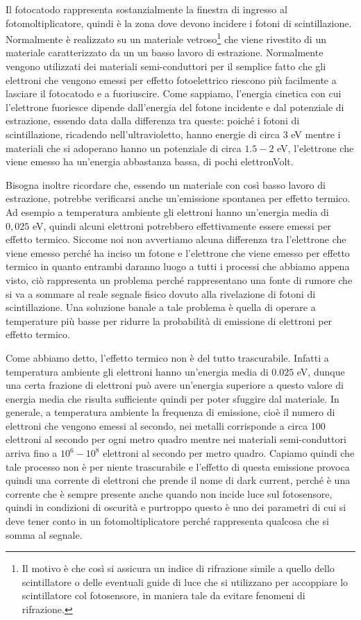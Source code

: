 Il fotocatodo rappresenta sostanzialmente la finestra di ingresso al fotomoltiplicatore, quindi è la zona dove devono incidere i fotoni di scintillazione. Normalmente è realizzato su un materiale vetroso\footnote{Il motivo è che così si assicura un indice di rifrazione simile a quello dello scintillatore o delle eventuali guide di luce che si utilizzano per accoppiare lo scintillatore col fotosensore, in maniera tale da evitare fenomeni di rifrazione.} che viene rivestito di un materiale caratterizzato da un un basso lavoro di estrazione. Normalmente vengono utilizzati dei materiali semi-conduttori per il semplice fatto che gli elettroni che vengono emessi per effetto fotoelettrico riescono più facilmente a lasciare il fotocatodo e a fuoriuscire. Come sappiamo, l'energia cinetica con cui l'elettrone fuoriesce dipende dall'energia del fotone incidente e dal potenziale di estrazione, essendo data dalla differenza tra queste: poiché i fotoni di scintillazione, ricadendo nell'ultravioletto, hanno energie di circa 3 eV mentre i materiali che si adoperano hanno un potenziale di circa $1.5-2$ eV, l'elettrone che viene emesso ha un'energia abbastanza bassa, di pochi elettronVolt.

Bisogna inoltre ricordare che, essendo un materiale con così basso lavoro di estrazione, potrebbe verificarsi anche un'emissione spontanea per effetto termico. Ad esempio a temperatura ambiente gli elettroni hanno un'energia media di $0,025$ eV, quindi alcuni elettroni potrebbero effettivamente essere emessi per effetto termico. Siccome noi non avvertiamo alcuna differenza tra l'elettrone che viene emesso perché ha inciso un fotone e l'elettrone che viene emesso per effetto termico in quanto entrambi daranno luogo a tutti i processi che abbiamo appena visto, ciò rappresenta un problema perché rappresentano una fonte di rumore che si va a sommare al reale segnale fisico dovuto alla rivelazione di fotoni di scintillazione. Una soluzione banale a tale problema è quella di operare a temperature più basse per ridurre la probabilità di emissione di elettroni per effetto termico.

Come abbiamo detto, l'effetto termico non è del tutto trascurabile. Infatti a temperatura ambiente gli elettroni hanno un'energia media di $0.025$ eV, dunque una certa frazione di elettroni può avere un'energia superiore a questo valore di energia media che risulta sufficiente quindi per poter sfuggire dal materiale. In generale, a temperatura ambiente la frequenza di emissione, cioè il numero di elettroni che vengono emessi al secondo, nei metalli corrisponde a circa 100 elettroni al secondo per ogni metro quadro mentre nei materiali semi-conduttori arriva fino a $10^6-10^8$ elettroni al secondo per metro quadro. Capiamo quindi che tale processo non è per niente trascurabile e l'effetto di questa emissione provoca quindi una corrente di elettroni che prende il nome di dark current, perché è una corrente che è sempre presente anche quando non incide luce sul fotosensore, quindi in condizioni di oscurità e purtroppo questo è uno dei parametri di cui si deve tener conto in un fotomoltiplicatore perché rappresenta qualcosa che si somma al segnale.

